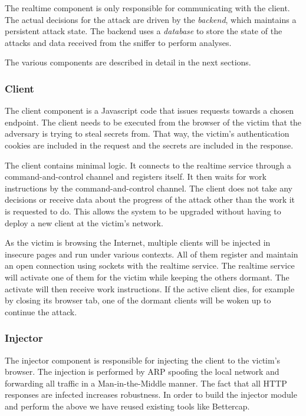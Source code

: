 The realtime component is only responsible for communicating with the client.
The actual decisions for the attack are driven by the \textit{backend}, which
maintains a persistent attack state. The backend uses a \textit{database} to
store the state of the attacks and data received from the sniffer to perform
analyses.

The various components are described in detail in the next sections.

\subsubsection{Client}

The client component is a Javascript code that issues requests towards a chosen
endpoint. The client needs to be executed from the browser of the victim that
the adversary is trying to steal secrets from. That way, the victim's
authentication cookies are included in the request and the secrets are included
in the response.

The client contains minimal logic. It connects to the realtime service through a
command-and-control channel and registers itself. It then waits for work
instructions by the command-and-control channel. The client does not take any
decisions or receive data about the progress of the attack other than the work
it is requested to do. This allows the system to be upgraded without having to
deploy a new client at the victim's network.

As the victim is browsing the Internet, multiple clients will be injected in
insecure pages and run under various contexts. All of them register and maintain
an open connection using sockets with the realtime service. The realtime service
will activate one of them for the victim while keeping the others dormant. The
activate will then receive work instructions. If the active client dies, for
example by closing its browser tab, one of the dormant clients will be woken up
to continue the attack.

\subsubsection{Injector}

The injector component is responsible for injecting the client to the victim's
browser. The injection is performed by ARP spoofing the local network and
forwarding all traffic in a Man-in-the-Middle manner. The fact that all HTTP
responses are infected increases robustness. In order to build the injector
module and perform the above we have reused existing tools like Bettercap.

